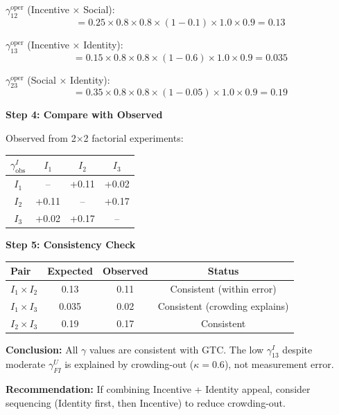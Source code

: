 \begin{tcolorbox}[colback=gray!5!white, colframe=gray!75!black,
    title=Worked Example: Are Our $\gamma$ Values Consistent?]
$\gamma^{\text{oper}}_{12}$ (Incentive × Social):
\begin{equation}
= 0.25 \times 0.8 \times 0.8 \times (1-0.1) \times 1.0 \times 0.9 = 0.13
\end{equation}

$\gamma^{\text{oper}}_{13}$ (Incentive × Identity):
\begin{equation}
= 0.15 \times 0.8 \times 0.8 \times (1-0.6) \times 1.0 \times 0.9 = 0.035
\end{equation}

$\gamma^{\text{oper}}_{23}$ (Social × Identity):
\begin{equation}
= 0.35 \times 0.8 \times 0.8 \times (1-0.05) \times 1.0 \times 0.9 = 0.19
\end{equation}

\textbf{Step 4: Compare with Observed}

Observed from 2×2 factorial experiments:
\begin{center}
\begin{tabular}{c|ccc}
$\gamma^I_{\text{obs}}$ & $I_1$ & $I_2$ & $I_3$ \\
\hline
$I_1$ & -- & +0.11 & +0.02 \\
$I_2$ & +0.11 & -- & +0.17 \\
$I_3$ & +0.02 & +0.17 & -- \\
\end{tabular}
\end{center}

\textbf{Step 5: Consistency Check}

\begin{center}
\begin{tabular}{lccc}
\textbf{Pair} & \textbf{Expected} & \textbf{Observed} & \textbf{Status} \\
\hline
$I_1 \times I_2$ & 0.13 & 0.11 & Consistent (within error) \\
$I_1 \times I_3$ & 0.035 & 0.02 & Consistent (crowding explains) \\
$I_2 \times I_3$ & 0.19 & 0.17 & Consistent \\
\end{tabular}
\end{center}

\textbf{Conclusion:} All $\gamma$ values are consistent with GTC. The low
$\gamma^I_{13}$ despite moderate $\gamma^U_{FI}$ is explained by crowding-out
($\kappa = 0.6$), not measurement error.

\textbf{Recommendation:} If combining Incentive + Identity appeal, consider
sequencing (Identity first, then Incentive) to reduce crowding-out.

\end{tcolorbox}

